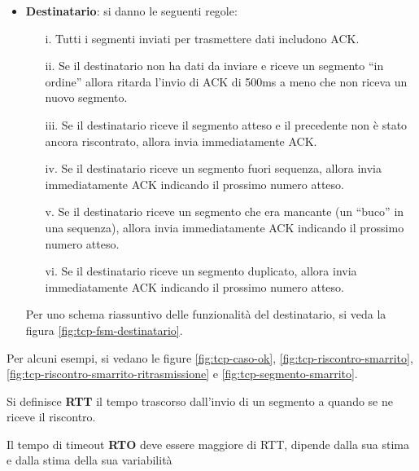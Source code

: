 \documentclass[11pt, italian, openany]{book}
\begin{document}
\begin{sloppypar}
\begin{itemize}[topsep=0pt, itemsep=0pt, parsep=0pt]
\begin{itemize}[topsep=0pt, itemsep=0pt, parsep=0pt]
\begin{itemize}[topsep=0pt, itemsep=0pt, parsep=0pt]
			Nel caso di segmenti fuori sequenza, i dati possono essere memorizzati dall’entit\`a TCP destinataria (nota: TCP non dice come il destinatario
			deve gestire i pacchetti fuori sequenza) temporaneamente; nelle versioni più recenti si implementa ``SACK": i pacchetti ricevuti fuori sequenza
			vengono memorizzati e il riscontro di pacchetti fuori sequenza e duplicati viene inviato in OPTIONS.

			Per uno schema riassuntivo delle funzionalit\`a del mittente, si veda la figura \ref{fig:tcp-fsm-mittente}.
			\item \textbf{Destinatario}: si danno le seguenti regole:
			\begin{itemize}
				\item[i.] Tutti i segmenti inviati per trasmettere dati includono ACK.
				\item[ii.] Se il destinatario non ha dati da inviare e riceve un segmento ``in ordine'' allora ritarda l'invio di ACK di 500ms a meno che non
				riceva un nuovo segmento.
				\item[iii.] Se il destinatario riceve il segmento atteso e il precedente non \`e stato ancora riscontrato, allora invia immediatamente ACK.
				\item[iv.] Se il destinatario riceve un segmento fuori sequenza, allora invia immediatamente ACK indicando il prossimo numero atteso.
				\item[v.] Se il destinatario riceve un segmento che era mancante (un ``buco'' in una sequenza), allora invia immediatamente ACK indicando il
				prossimo numero atteso.
				\item[vi.] Se il destinatario riceve un segmento duplicato, allora invia immediatamente ACK indicando il prossimo numero atteso.
			\end{itemize}

			Per uno schema riassuntivo delle funzionalit\`a del destinatario, si veda la figura \ref{fig:tcp-fsm-destinatario}.
		\end{itemize}

		Per alcuni esempi, si vedano le figure \ref{fig:tcp-caso-ok}, \ref{fig:tcp-riscontro-smarrito}, \ref{fig:tcp-riscontro-smarrito-ritrasmissione}
		e \ref{fig:tcp-segmento-smarrito}.

		Si definisce \textbf{RTT} il tempo trascorso dall'invio di un segmento a quando se ne riceve il riscontro.

		Il tempo di timeout \textbf{RTO} deve essere maggiore di RTT, dipende dalla sua stima e dalla stima della sua variabilit\`a


\end{itemize}
\end{itemize}
\end{sloppypar}
\end{document}
